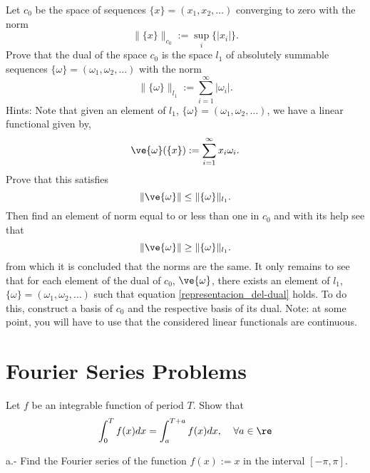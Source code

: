 \bpro
Let $c_0$ be the space of sequences 
$\{x\} = (x_1,x_2, \dots)$
converging to zero with the norm
\begin{equation}
  \label{eq:norma_c_0}
  \|\{x\}\|_{c_0} := \sup_{i} \{|x_i|\}.
\end{equation}
%
Prove that the dual of the space $c_0$ is the space $l_1$ of absolutely summable sequences
$\{\omega\}= (\omega_1,\omega_2, \dots)$ with the norm
\begin{equation}
  \label{eq:norma_l_1}
  \|\{\omega\}\|_{l_1} := \sum_{i=1}^{\infty} |\omega_i|.
\end{equation}
%
Hints: 
Note that given an element of $l_1$, $\{\omega\}=(\omega_1,\omega_2,\dots)$,
we have a linear functional given by,
\begin{equation}
  \label{representacion_del-dual}
  \ve{\omega}(\{x\}) := \sum_{i=1}^{\infty} x_i \omega_i.
\end{equation}
Prove that this satisfies 
\begin{equation}
  \|\ve{\omega}\| \leq \|\{\omega\}\|_{l_1}.
\end{equation}
Then find an element of norm equal to or less than one in $c_0$ 
and with its help see that 
\begin{equation}
  \|\ve{\omega}\| \geq \|\{\omega\}\|_{l_1}.
\end{equation}
from which it is concluded that the norms are the same.
It only remains to see that for each element of the dual of $c_0$, $\ve{\omega}$,
there exists an element of $l_1$, $\{\omega\}=(\omega_1,\omega_2,\dots)$ such that 
equation \ref{representacion_del-dual} holds. 
To do this, construct a basis of $c_0$ and the respective basis of its dual.
Note: at some point, you will have to use that the considered linear functionals
are continuous.
\epro


\section{Fourier Series Problems}

\bpro
Let $f$ be an integrable function of period $T$. Show that
\begin{equation}
  \int_0^T f(x)dx = \int_a^{T+a} f(x)dx, \;\;\;\; \forall a \in \re
\end{equation}
\epro


\bpro
\espa
a.- Find the Fourier series of the function $f(x) := x$ in the
interval $[-\pi,\pi]$.

